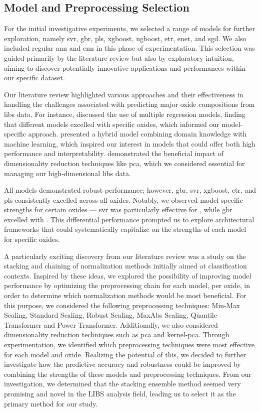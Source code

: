 \subsection{Model and Preprocessing Selection}
For the initial investigative experiments, we selected a range of models for further exploration, namely \gls{svr}, \gls{gbr}, \gls{pls}, \gls{xgboost}, \gls{ngboost}, \gls{etr}, \gls{enet}, and \gls{sgd}.
We also included regular \gls{ann} and \gls{cnn} in this phase of experimentation.
This selection was guided primarily by the literature review but also by exploratory intuition, aiming to discover potentially innovative applications and performances within our specific dataset.

Our literature review highlighted various approaches and their effectiveness in handling the challenges associated with predicting major oxide compositions from \gls{libs} data.
For instance, \citet{andersonImprovedAccuracyQuantitative2017} discussed the use of multiple regression models, finding that different models excelled with specific oxides, which informed our model-specific approach.
\citet{song_DF-K-ELM} presented a hybrid model combining domain knowledge with machine learning, which inspired our interest in models that could offer both high performance and interpretability. \citet{rezaei_dimensionality_reduction} demonstrated the beneficial impact of dimensionality reduction techniques like \gls{pca}, which we considered essential for managing our high-dimensional \gls{libs} data.

All models demonstrated robust performance; however, \gls{gbr}, \gls{svr}, \gls{xgboost}, \gls{etr}, and \gls{pls} consistently excelled across all oxides.
Notably, we observed model-specific strengths for certain oxides --- \gls{svr} was particularly effective for , while \gls{gbr} excelled with .
This differential performance prompted us to explore architectural frameworks that could systematically capitalize on the strengths of each model for specific oxides.

A particularly exciting discovery from our literature review was a study on the stacking and chaining of normalization methods initially aimed at classification contexts.
Inspired by these ideas, we explored the possibility of improving model performance by optimizing the preprocessing chain for each model, per oxide, in order to determine which normalization methods would be most beneficial.
For this purpose, we considered the following preprocessing techniques: Min-Max Scaling, Standard Scaling, Robust Scaling, MaxAbs Scaling, Quantile Transformer and Power Transformer.
Additionally, we also considered dimensionality reduction techniques such as \gls{pca} and \gls{kernel-pca}.
Through experimentation, we identified which preprocessing techniques were most effective for each model and oxide.
Realizing the potential of this, we decided to further investigate how the predictive accuracy and robustness could be improved by combining the strengths of these models and preprocessing techniques.
From our investigation, we determined that the stacking ensemble method seemed very promising and novel in the LIBS analysis field, leading us to select it as the primary method for our study.

